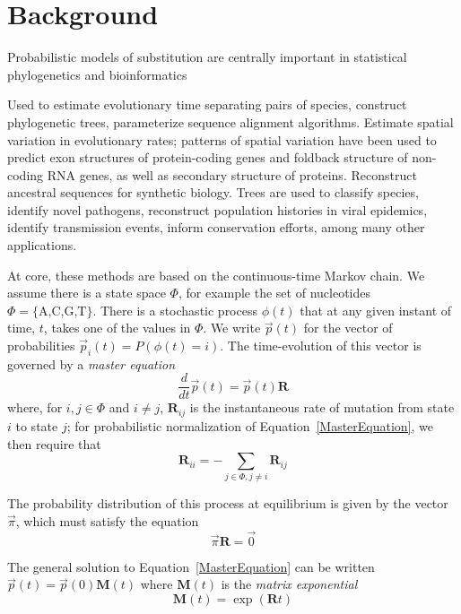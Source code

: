 \documentclass{bmcart}
\newcommand{\matr}[1]{\mathbf{#1}}
\newcommand{\eqref}[1]{Equation~\ref{#1}}
\newcommand{\statespace}{\Phi}
\newcommand{\state}{\phi}
\newcommand{\statevec}{\vec{p}}
\newcommand{\ratematrix}{\matr{R}}
\newcommand{\eqmvec}{\vec{\pi}}
\newcommand{\condmatrix}{\matr{M}}
\begin{document}
\section*{Background}

Probabilistic models of substitution are centrally important in statistical phylogenetics and bioinformatics

Used to estimate evolutionary time separating pairs of species,
construct phylogenetic trees,
parameterize sequence alignment algorithms.
Estimate spatial variation in evolutionary rates;
patterns of spatial variation have been used to
predict exon structures of protein-coding genes
and foldback structure of non-coding RNA genes,
as well as secondary structure of proteins.
Reconstruct ancestral sequences for synthetic biology.
Trees are used to classify species,
identify novel pathogens,
reconstruct population histories in viral epidemics,
identify transmission events,
inform conservation efforts,
among many other applications.

At core, these methods are based on the continuous-time Markov chain.
We assume there is a state space $\statespace$,
for example the set of nucleotides $\statespace = \{ \mbox{A,C,G,T} \}$.
There is a stochastic process $\state(t)$ that at any given instant of time, $t$,
takes one of the values in $\statespace$.
We write $\statevec(t)$ for the vector of probabilities
$\statevec_i(t) = P(\state(t) = i)$.
The time-evolution of this vector is governed by a {\em master equation}
\begin{equation}
\frac{d}{dt} \statevec(t) = \statevec(t) \ratematrix
\label{MasterEquation}
\end{equation}
where, for $i,j \in \statespace$ and $i \neq j$,
$\ratematrix_{ij}$ is the instantaneous rate of mutation from state $i$ to state $j$;
for probabilistic normalization of \eqref{MasterEquation},
we then require that
\[
\ratematrix_{ii} = -\sum_{j \in \statespace, j \neq i} \ratematrix_{ij}
\]

The probability distribution of this process at equilibrium is given by the vector $\eqmvec$,
which must satisfy the equation
\[
\eqmvec \ratematrix = \vec{0}
\]

The general solution to \eqref{MasterEquation} can be
written $\statevec(t) = \statevec(0) \condmatrix(t)$
where $\condmatrix(t)$ is the {\em matrix exponential}
\begin{equation}
\condmatrix(t) = \exp ( \ratematrix t )
\label{MatrixExponential}
\end{equation}
\end{document}
